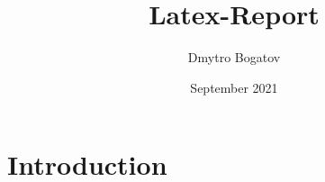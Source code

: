 \documentclass{article}
\title{Latex-Report}
\author{Dmytro Bogatov}
\date{September 2021}
\begin{document}
\maketitle

\section{Introduction}
\end{document}
